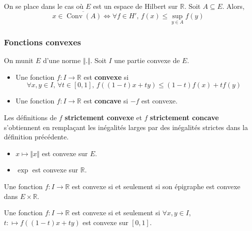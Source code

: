 	\begin{corollary}
		On se place dans le cas où $E$ est un espace de Hilbert sur $\mathbb{R}$. Soit $A \subseteq E$. Alors,
		\[ x \in \overline{\operatorname{Conv}(A)} \iff \forall f \in H', \, f(x) \leq \sup_{y \in A} f(y) \]
	\end{corollary}
	
	\subsubsection{Fonctions convexes}
	
	On munit $E$ d'une norme $\Vert . \Vert$. Soit $I$ une partie convexe de $E$.
	
	
	\begin{definition}
		\begin{itemize}
			\item Une fonction $f : I \rightarrow \mathbb{R}$ est \textbf{convexe} si
			\[ \forall x, y \in I, \, \forall t \in [0,1], \, f((1-t)x + ty) \leq (1-t)f(x) + tf(y) \]
			\item Une fonction $f : I \rightarrow \mathbb{R}$ est \textbf{concave} si $-f$ est convexe.
		\end{itemize}
	\end{definition}
	
	\begin{remark}
		Les définitions de $f$ \textbf{strictement convexe} et $f$ \textbf{strictement concave} s'obtiennent en remplaçant les inégalités larges par des inégalités strictes dans la définition précédente.
	\end{remark}
	
	\begin{example}
		\begin{itemize}
			\item $x \mapsto \Vert x \Vert$ est convexe sur $E$.
			\item $\exp$ est convexe sur $\mathbb{R}$.
		\end{itemize}
	\end{example}
	
	\begin{proposition}
		Une fonction $f : I \rightarrow \mathbb{R}$ est convexe si et seulement si son épigraphe est convexe dans $E \times \mathbb{R}$.
	\end{proposition}
	
	\begin{theorem}
		Une fonction $f : I \rightarrow \mathbb{R}$ est convexe si et seulement si $\forall x, y \in I$, $t : \mapsto f((1-t)x + ty)$ est convexe sur $[0,1]$.
	\end{theorem}
	
